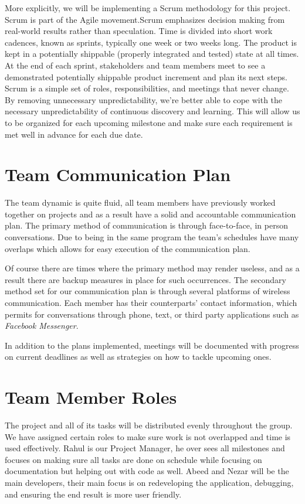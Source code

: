 \documentclass{article}
\begin{document}
\indent More explicitly, we will be implementing a Scrum methodology for this project. Scrum is part of the Agile movement.Scrum emphasizes decision making from real-world results rather than speculation. Time is divided into short work cadences, known as sprints, typically one week or two weeks long. The product is kept in a potentially shippable (properly integrated and tested) state at all times. At the end of each sprint, stakeholders and team members meet to see a demonstrated potentially shippable product increment and plan its next steps. Scrum is a simple set of roles, responsibilities, and meetings that never change. By removing unnecessary unpredictability, we’re better able to cope with the necessary unpredictability of continuous discovery and learning. This will allow us to be organized for each upcoming milestone and make sure each requirement is met well in advance for each due date.

\section{Team Communication Plan}
\indent The team dynamic is quite fluid, all team members have previously worked together on projects and as a result have a solid and accountable communication plan. The primary method of communication is through face-to-face, in person conversations. Due to being in the same program the team's schedules have many overlaps which allows for easy execution of the communication plan. 

Of course there are times where the primary method may render useless, and as a result there are backup measures in place for such occurrences. The secondary method set for our communication plan is through several platforms of wireless communication. Each member has their counterparts' contact information, which permits for conversations through phone, text, or third party applications such as \textit{Facebook Messenger}.

In addition to the plans implemented, meetings will be documented with progress on current deadlines as well as strategies on how to tackle upcoming ones.

\section{Team Member Roles}
\indent The project and all of its tasks will be distributed evenly throughout the group. We have assigned certain roles to make sure work is not overlapped and time is used effectively. Rahul is our Project Manager, he over sees all milestones and focuses on making sure all tasks are done on schedule while focusing on documentation but helping out with code as well. Abeed and Nezar will be the main developers, their main focus is on redeveloping the application, debugging, and ensuring the end result is more user friendly.
\end{document}
